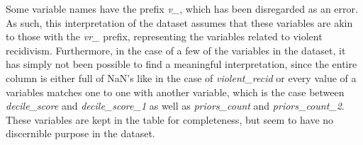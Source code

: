 \documentclass[11pt, fleqn, titlepage]{article}
\begin{document}
	\noindent Some variable names have the prefix \textit{v\_}, which has been disregarded as an error. As such, this interpretation of the dataset assumes that these variables are akin to those with the \textit{vr\_} prefix, representing the variables related to violent recidivism. Furthermore, in the case of a few of the variables in the dataset, it has simply not been possible to find a meaningful interpretation, since the entire column is either full of NaN's like in the case of \textit{violent\_recid} or every value of a variables matches one to one with another variable, which is the case between \textit{decile\_score} and \textit{decile\_score\_1} as well as \textit{priors\_count} and \textit{priors\_count\_2}. These variables are kept in the table for completeness, but seem to have no discernible purpose in the dataset.
	
\end{document}

